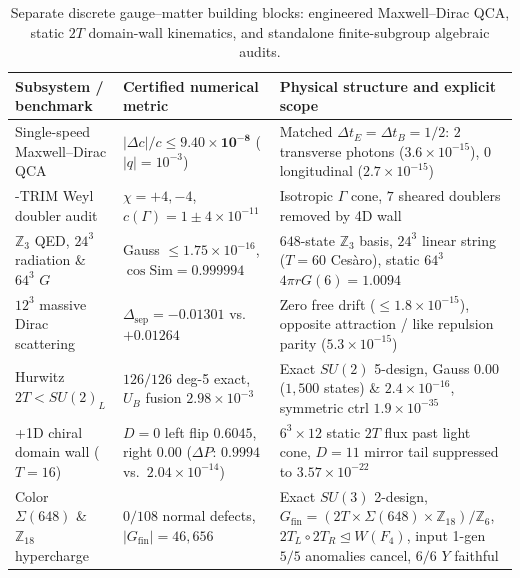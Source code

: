 \begin{table}[tb]
\centering
\caption{Separate discrete gauge--matter building blocks: engineered Maxwell--Dirac QCA, static $2T$ domain-wall
kinematics, and standalone finite-subgroup algebraic audits.}
\label{tab:unified-gauge}
\footnotesize
\begin{tabularx}{\textwidth}{@{}>{\raggedright\arraybackslash}p{3.65cm}>{\raggedright\arraybackslash}p{3.65cm}>{\raggedright\arraybackslash}X@{}}
\toprule
Subsystem / benchmark & Certified numerical metric & Physical structure and explicit scope \\
\midrule
Single-speed Maxwell--Dirac QCA & $|\Delta c|/c \le \mathbf{9.40 \times 10^{-8}}$ ($|q|=10^{-3}$) & Matched $\Delta t_E = \Delta t_B = 1/2$: $2$ transverse photons ($3.6 \times 10^{-15}$), $0$ longitudinal ($2.7 \times 10^{-15}$) \\
\addlinespace[2pt]
8-TRIM Weyl doubler audit & $\chi = +4, -4$, $c(\Gamma) = 1 \pm 4 \times 10^{-11}$ & Isotropic $\Gamma$ cone, $7$ sheared doublers removed by 4D wall \\
\addlinespace[2pt]
$\mathbb{Z}_3$ QED, $24^3$ radiation \& $64^3$ $G$ & Gauss $\le 1.75 \times 10^{-16}$, $\cos\mathrm{Sim} = \mathbf{0.999994}$ & $648$-state $\mathbb{Z}_3$ basis, $24^3$ linear string ($T = 60$ Ces\`aro), static $64^3$ $4\pi r G(6) = 1.0094$ \\
\addlinespace[2pt]
$12^3$ massive Dirac scattering & $\Delta_{\mathrm{sep}} = -0.01301$ vs.\ $+0.01264$ & Zero free drift ($\le 1.8 \times 10^{-15}$), opposite attraction / like repulsion parity ($5.3 \times 10^{-15}$) \\
\addlinespace[2pt]
Hurwitz $2T < SU(2)_L$ & $126/126$ deg-5 exact, $U_B$ fusion $2.98 \times 10^{-3}$ & Exact $SU(2)$ 5-design, Gauss $0.00$ ($1{,}500$ states) \& $2.4 \times 10^{-16}$, symmetric ctrl $1.9 \times 10^{-35}$ \\
\addlinespace[2pt]
3+1D chiral domain wall ($T = 16$) & $D=0$ left flip $\mathbf{0.6045}$, right $\mathbf{0.00}$ ($\Delta P$: $0.9994$ vs.\ $2.04 \times 10^{-14}$) & $6^3 \times 12$ static $2T$ flux past light cone, $D = 11$ mirror tail suppressed to $3.57 \times 10^{-22}$ \\
\addlinespace[2pt]
Color $\Sigma(648)$ \& $\mathbb{Z}_{18}$ hypercharge & $0/108$ normal defects, $|G_{\mathrm{fin}}| = 46{,}656$ & Exact $SU(3)$ 2-design, $G_{\mathrm{fin}} = (2T \times \Sigma(648) \times \mathbb{Z}_{18})/\mathbb{Z}_6$, $2T_L \circ 2T_R \trianglelefteq W(F_4)$, input 1-gen $5/5$ anomalies cancel, $6/6$ $Y$ faithful \\
\bottomrule
\end{tabularx}
\end{table}

